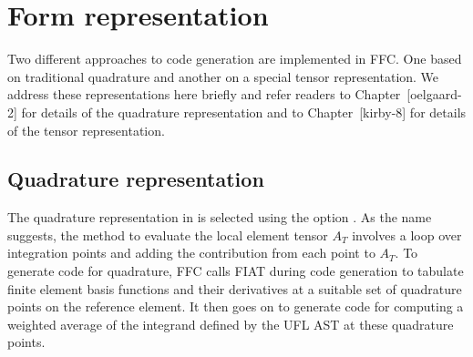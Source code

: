 \section{Form representation}
\label{sec:representation}

Two different approaches to code generation are implemented in
FFC. One based on traditional quadrature and another on a special
tensor representation. We address these representations here briefly
and refer readers to Chapter~[oelgaard-2] for details of the quadrature
representation and to Chapter~[kirby-8] for details of the tensor
representation.
\subsection{Quadrature representation}

The quadrature representation in \ffc{} is selected using the
option .  As the name suggests, the method to
evaluate the local element tensor $A_T$ involves a loop over
integration points and adding the contribution from each point to
$A_T$. To generate code for quadrature, FFC calls FIAT during code
generation to tabulate finite element basis functions and their
derivatives at a suitable set of quadrature points on the reference
element. It then goes on to generate code for computing a weighted
average of the integrand defined by the UFL AST at these quadrature
points.

